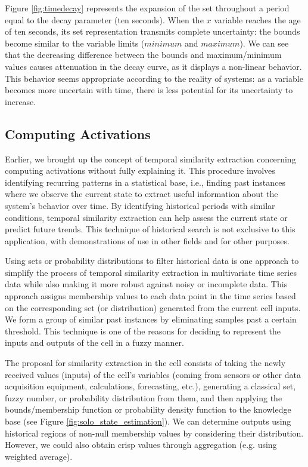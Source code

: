 Figure \ref{fig:timedecay} represents the expansion of the set throughout a period equal to the decay parameter (ten seconds). When the $x$ variable reaches the age of ten seconds, its set representation transmits complete uncertainty: the bounds become similar to the variable limits ($minimum$ and $maximum$). We can see that the decreasing difference between the bounds and maximum/minimum values causes attenuation in the decay curve, as it displays a non-linear behavior. This behavior seems appropriate according to the reality of systems: as a variable becomes more uncertain with time, there is less potential for its uncertainty to increase.


\subsection{Computing Activations} \label{subsec:tempsim}

Earlier, we brought up the concept of temporal similarity extraction concerning computing activations without fully explaining it. This procedure involves identifying recurring patterns in a statistical base, i.e., finding past instances where we observe the current state to extract useful information about the system's behavior over time. By identifying historical periods with similar conditions, temporal similarity extraction can help assess the current state or predict future trends. This technique of historical search is not exclusive to this application, with demonstrations of use in other fields and for other purposes.

Using sets or probability distributions to filter historical data is one approach to simplify the process of temporal similarity extraction in multivariate time series data while also making it more robust against noisy or incomplete data. This approach assigns membership values to each data point in the time series based on the corresponding set (or distribution) generated from the current cell inputs. We form a group of similar past instances by eliminating samples past a certain threshold. This technique is one of the reasons for deciding to represent the inputs and outputs of the cell in a fuzzy manner.

The proposal for similarity extraction in the cell consists of taking the newly received values (inputs) of the cell's variables (coming from sensors or other data acquisition equipment, calculations, forecasting, etc.), generating a classical set, fuzzy number, or probability distribution from them, and then applying the bounds/membership function or probability density function to the knowledge base (see Figure \ref{fig:solo_state_estimation}). We can determine outputs using historical regions of non-null membership values by considering their distribution. However, we could also obtain crisp values through aggregation (e.g. using weighted average).


